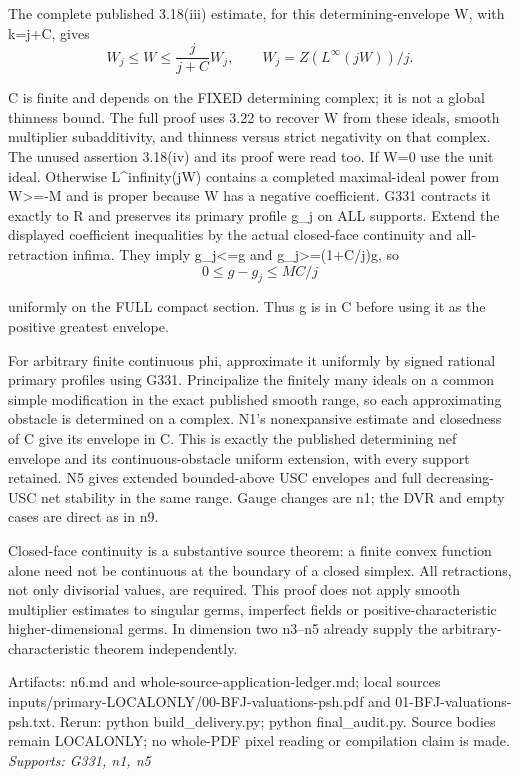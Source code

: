 \documentclass[11pt]{article}
\begin{document}
The complete published 3.18(iii) estimate, for this determining-envelope W, with k=j+C, gives
\[
W_j\le W\le\frac{j}{j+C}W_j,
\qquad W_j=Z(L^\infty(jW))/j.
\]

C is finite and depends on the FIXED determining complex; it is not a global thinness bound. The full proof uses 3.22 to recover W from these ideals, smooth multiplier subadditivity, and thinness versus strict negativity on that complex. The unused assertion 3.18(iv) and its proof were read too. If W=0 use the unit ideal. Otherwise L\textasciicircum{}infinity(jW) contains a completed maximal-ideal power from W>=-M and is proper because W has a negative coefficient. G331 contracts it exactly to R and preserves its primary profile g\_j on ALL supports. Extend the displayed coefficient inequalities by the actual closed-face continuity and all-retraction infima. They imply g\_j<=g and g\_j>=(1+C/j)g, so
\[
0\le g-g_j\le MC/j
\]

uniformly on the FULL compact section. Thus g is in C before using it as the positive greatest envelope.

For arbitrary finite continuous phi, approximate it uniformly by signed rational primary profiles using G331. Principalize the finitely many ideals on a common simple modification in the exact published smooth range, so each approximating obstacle is determined on a complex. N1's nonexpansive estimate and closedness of C give its envelope in C. This is exactly the published determining nef envelope and its continuous-obstacle uniform extension, with every support retained. N5 gives extended bounded-above USC envelopes and full decreasing-USC net stability in the same range. Gauge changes are n1; the DVR and empty cases are direct as in n9.

Closed-face continuity is a substantive source theorem: a finite convex function alone need not be continuous at the boundary of a closed simplex. All retractions, not only divisorial values, are required. This proof does not apply smooth multiplier estimates to singular germs, imperfect fields or positive-characteristic higher-dimensional germs. In dimension two n3--n5 already supply the arbitrary-characteristic theorem independently.

Artifacts: n6.md and whole-source-application-ledger.md; local sources inputs/primary-LOCALONLY/00-BFJ-valuations-psh.pdf and 01-BFJ-valuations-psh.txt. Rerun: python build\_delivery.py; python final\_audit.py. Source bodies remain LOCALONLY; no whole-PDF pixel reading or compilation claim is made.
\textit{Supports: G331, n1, n5}
\end{document}
